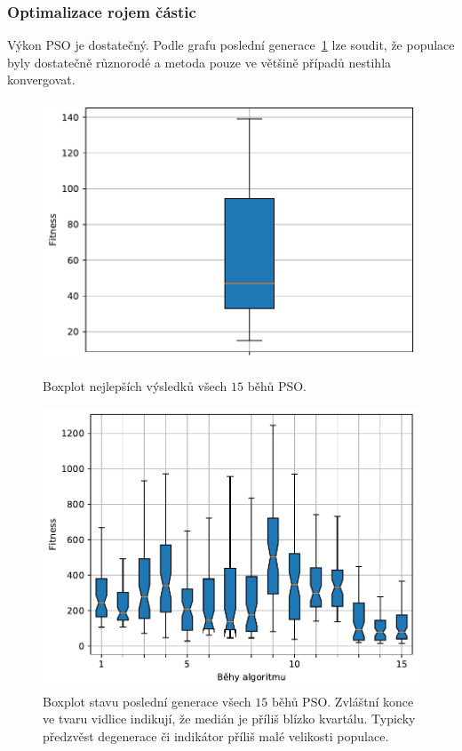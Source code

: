\subsubsection{Optimalizace rojem částic}
Výkon PSO je dostatečný. Podle grafu poslední generace~\ref{fg:hifu:pso:lastGen} lze soudit, že populace byly dostatečně různorodé a metoda pouze ve většině případů nestihla konvergovat.
\begin{figure}[H]
\begin{minipage}[t]{0.475\linewidth}
\includegraphics[width=\linewidth]{obrazky-figures/statistics/HIFU/blob/4/PSO/bestsBoxplot_WithOutliers.pdf}
\caption{Boxplot nejlepších výsledků všech $15$ běhů PSO.}
\label{fg:hifu:pso:best}
\end{minipage}
\hfill
\begin{minipage}[t]{0.475\linewidth}
\includegraphics[width=\linewidth]{obrazky-figures/statistics/HIFU/blob/4/PSO/lastGenBoxplots.pdf}
\caption{Boxplot stavu poslední generace všech $15$ běhů PSO. Zvláštní konce ve tvaru vidlice indikují, že medián je příliš blízko kvartálu. Typicky předzvěst degenerace či indikátor příliš malé velikosti populace. }
\label{fg:hifu:pso:lastGen}
\end{minipage}
\end{figure}


